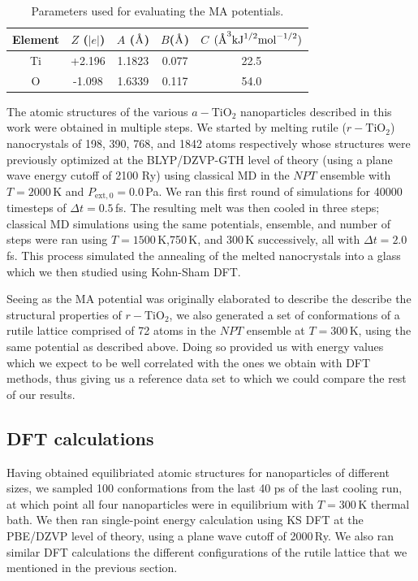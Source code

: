 \documentclass[aps,prb,twocolumn,amsmath,amssymb,superscriptaddress,longbibliography]{revtex4-1}
\newcommand{\angstrom}{\text{\normalfont\AA}}
\newcommand\tab[1][1cm]{\hspace*{#1}} %
\begin{document}
\begin{table}[]
\centering
\caption{Parameters used for evaluating the MA potentials.}
\label{classpot}
\
\begin{tabular}{ccccc}
\hline
Element & $Z$ ($|e|$) & $A$ ($\angstrom$) & $B$($\angstrom$) & $C$ $(\angstrom^3\text{kJ}^{1/2}\text{mol}^{-1/2})$ \\ \hline
Ti      & +2.196      & 1.1823            & 0.077            & 22.5                                                \\
O       & -1.098      & 1.6339            & 0.117            & 54.0                                                \\ \hline
\end{tabular}
\end{table}

\tab The atomic structures of the various $a-\text{TiO}_2$ nanoparticles described in this work were obtained in multiple steps.
We started by melting rutile ($r-\text{TiO}_2$) nanocrystals of 198, 390, 768, and 1842 atoms respectively whose structures were previously optimized at the BLYP/DZVP-GTH level of theory (using a plane wave energy cutoff of 2100 Ry) using classical MD in the $NPT$ ensemble with $T = 2000\,$K and $P_{\text{ext},0} = 0.0\,$Pa. 
We ran this first round of simulations for 40000 timesteps of $\Delta t = 0.5\,$fs.
The resulting melt was then cooled in three steps; classical MD simulations using the same potentials, ensemble, and number of steps were ran using $T = 1500\,$K,750$\,$K, and 300$\,$K successively, all with $\Delta t = 2.0\,$fs.
This process simulated the annealing of the melted nanocrystals into a glass which we then studied using Kohn-Sham DFT.

\tab Seeing as the MA potential was originally elaborated to describe the describe the structural properties of $r-\text{TiO}_2$, we also generated a set of conformations of a rutile lattice comprised of 72 atoms in the $NPT$ ensemble at $T = 300\,\text{K}$, using the same potential as described above.
Doing so provided us with energy values which we expect to be well correlated with the ones we obtain with DFT methods, thus giving us a reference data set to which we could compare the rest of our results.

\subsection{DFT calculations}

\tab Having obtained equilibriated atomic structures for nanoparticles of different sizes, we sampled 100 conformations from the last 40 ps of the last cooling run, at which point all four nanoparticles were in equilibrium with $T = 300\,\text{K}$ thermal bath.
We then ran single-point energy calculation using KS DFT at the PBE/DZVP level of theory, using a plane wave cutoff of 2000$\,$Ry.
We also ran similar DFT calculations the different configurations of the rutile lattice that we mentioned in the previous section.
\end{document}
